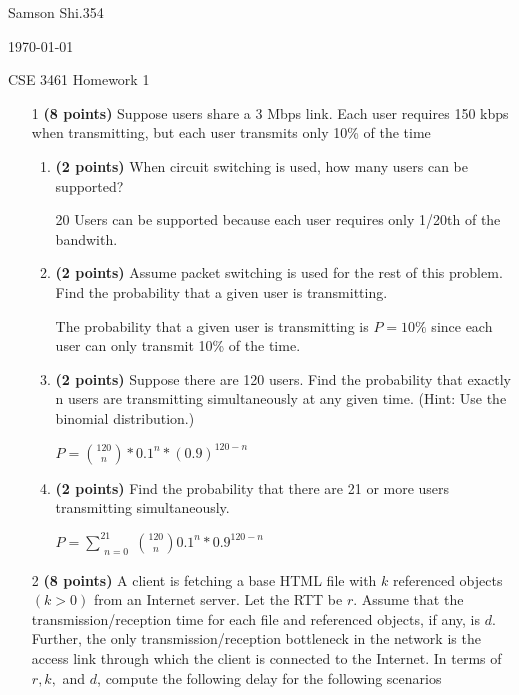 \documentclass{article}
\begin{document}
\begin{flushright}
Samson Shi.354

\today

CSE 3461 Homework 1
\end{flushright}

\begin{enumerate}

\item[1]\textbf{(8 points)} Suppose users share a 3 Mbps link. Each user requires 150 kbps when transmitting, but each user transmits only 10\% of the time

\begin{enumerate}
\item \textbf{(2 points)} When circuit switching is used, how many users can be supported? 

20 Users can be supported because each user requires only 1/20th of the bandwith.

\item \textbf{(2 points)} Assume packet switching is used for the rest of this problem. Find the probability that a given user is transmitting.

The probability that a given user is transmitting is $P = 10\%$ since each user can only transmit 10\% of the time. 

\item \textbf{(2 points)} Suppose there are 120 users. Find the probability that exactly n users are transmitting simultaneously at any given time. (Hint: Use the binomial distribution.)

$P=\binom{120}{n} * 0.1^n * (0.9)^{120-n}$

\item \textbf{(2 points)} Find the probability that there are 21 or more users transmitting simultaneously.

$P = \sum_{\substack{n=0}}^{21} \binom{120}{n}0.1^n * 0.9^{120-n}$

\end{enumerate}

\item[2]\textbf{(8 points)} A client is fetching a base HTML file with $k$ referenced objects $(k > 0)$ from an Internet server. Let the RTT be $r$. Assume that the transmission/reception time for each file and referenced objects, if any, is $d$. Further, the only transmission/reception bottleneck in the network is the access link through which the client is connected to the Internet. In terms of $r, k,$ and $d$, compute the following delay for the following scenarios


\end{enumerate}
\end{document}
